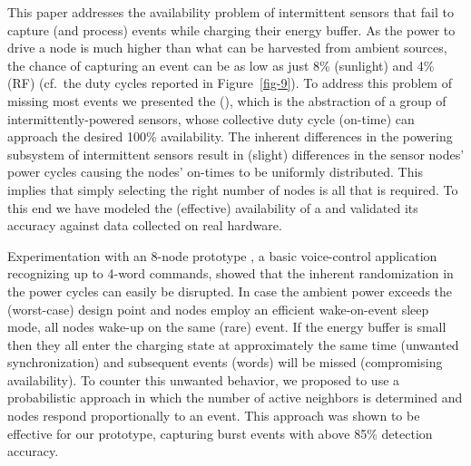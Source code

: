 This paper addresses the availability problem of intermittent sensors
that fail to capture (and process) events while charging their energy
buffer.  As the power to drive a node is much higher than what can be
harvested from ambient sources, the chance of capturing an event can
be as low as just 8\% (sunlight) and 4\% (RF) (cf.\ the duty cycles
reported in Figure~\ref{fig-9}). To address this problem of missing
most events we presented the \fullcis (\cis),
which is the abstraction of a group of intermittently-powered sensors,
whose collective duty cycle (on-time) can approach the desired 100\%
availability.  The inherent differences in the powering subsystem of
intermittent sensors result in (slight) differences in the sensor nodes'
power cycles causing the nodes' on-times to be uniformly distributed. This
implies that simply selecting the right number of nodes is all that
is required. To this end we have modeled the (effective) availability
of a \cis and validated its accuracy against data collected on real
hardware.

Experimentation with an 8-node prototype \cis, a basic voice-control
application recognizing up to 4-word commands, showed that the inherent
randomization in the power cycles can easily be disrupted. In case the
ambient power exceeds the (worst-case) design point and nodes employ an
efficient wake-on-event sleep mode, all nodes wake-up on the same (rare)
event. If the energy buffer is small then they all enter the charging
state at approximately the same time (unwanted synchronization) and
subsequent events (words) will be missed (compromising availability).
To counter this unwanted behavior, we proposed to use a probabilistic
approach in which the number of active neighbors is determined and nodes
respond proportionally to an event. This approach was shown to be effective
for our prototype, capturing burst events with above 85\% detection accuracy.





